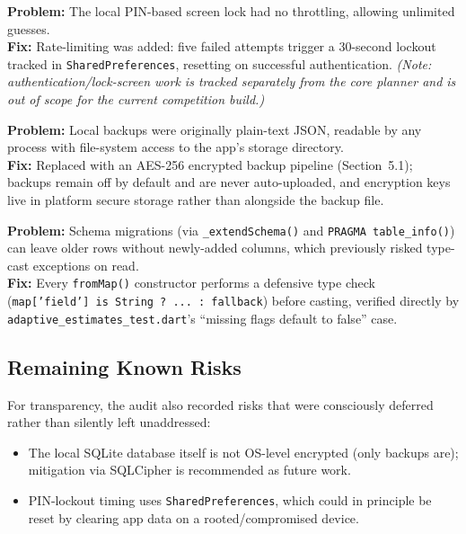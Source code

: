\documentclass[11pt,a4paper]{article}
\begin{document}
\begin{tcolorbox}[colback=softgray, colframe=primaryblue, title={Case 2 --- PIN brute-force exposure}, fonttitle=\bfseries, coltitle=white, colbacktitle=primaryblue, arc=2pt]
\textbf{Problem:} The local PIN-based screen lock had no throttling, allowing unlimited guesses. \\
\textbf{Fix:} Rate-limiting was added: five failed attempts trigger a 30-second lockout tracked in \texttt{SharedPreferences}, resetting on successful authentication. \emph{(Note: authentication/lock-screen work is tracked separately from the core planner and is out of scope for the current competition build.)}
\end{tcolorbox}

\begin{tcolorbox}[colback=softgray, colframe=primaryblue, title={Case 3 --- Unencrypted backups}, fonttitle=\bfseries, coltitle=white, colbacktitle=primaryblue, arc=2pt]
\textbf{Problem:} Local backups were originally plain-text JSON, readable by any process with file-system access to the app's storage directory. \\
\textbf{Fix:} Replaced with an AES-256 encrypted backup pipeline (Section~5.1); backups remain off by default and are never auto-uploaded, and encryption keys live in platform secure storage rather than alongside the backup file.
\end{tcolorbox}

\begin{tcolorbox}[colback=softgray, colframe=primaryblue, title={Case 4 --- Legacy / partial data during migration}, fonttitle=\bfseries, coltitle=white, colbacktitle=primaryblue, arc=2pt]
\textbf{Problem:} Schema migrations (via \texttt{\_extendSchema()} and \texttt{PRAGMA table\_info()}) can leave older rows without newly-added columns, which previously risked type-cast exceptions on read. \\
\textbf{Fix:} Every \texttt{fromMap()} constructor performs a defensive type check (\texttt{map['field'] is String ? ... : fallback}) before casting, verified directly by \texttt{adaptive\_estimates\_test.dart}'s ``missing flags default to false'' case.
\end{tcolorbox}

\subsection{Remaining Known Risks}
For transparency, the audit also recorded risks that were consciously deferred rather than silently left unaddressed:
\begin{itemize}[nosep]
    \item The local SQLite database itself is not OS-level encrypted (only backups are); mitigation via SQLCipher is recommended as future work.
    \item PIN-lockout timing uses \texttt{SharedPreferences}, which could in principle be reset by clearing app data on a rooted/compromised device.
\end{itemize}
\end{document}

